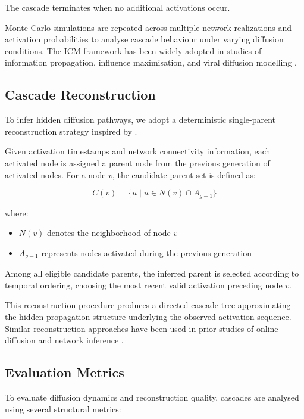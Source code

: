 \documentclass{article}
\begin{document}
The cascade terminates when no additional activations occur.

Monte Carlo simulations are repeated across multiple network realizations and activation probabilities to analyse cascade behaviour under varying diffusion conditions. The ICM framework has been widely adopted in studies of information propagation, influence maximisation, and viral diffusion modelling \citep{kempe2003maximizing,liu2025thorough}.

\subsection{Cascade Reconstruction}

To infer hidden diffusion pathways, we adopt a deterministic single-parent reconstruction strategy inspired by \citet{goel2016structural}.

Given activation timestamps and network connectivity information, each activated node is assigned a parent node from the previous generation of activated nodes. For a node $v$, the candidate parent set is defined as:

\[
C(v) = \{u \mid u \in N(v) \cap A_{g-1}\}
\]

where:

\begin{itemize}
    \item $N(v)$ denotes the neighborhood of node $v$
    \item $A_{g-1}$ represents nodes activated during the previous generation
\end{itemize}

Among all eligible candidate parents, the inferred parent is selected according to temporal ordering, choosing the most recent valid activation preceding node $v$.

This reconstruction procedure produces a directed cascade tree approximating the hidden propagation structure underlying the observed activation sequence. Similar reconstruction approaches have been used in prior studies of online diffusion and network inference \citep{goel2016structural,gomez2012inferring,braunstein2019network}.

\subsection{Evaluation Metrics}

To evaluate diffusion dynamics and reconstruction quality, cascades are analysed using several structural metrics:
\end{document}
